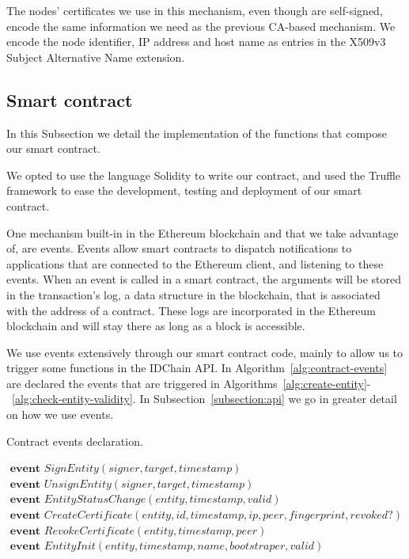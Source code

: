 The nodes' certificates we use in this mechanism, even though are self-signed, encode the same information we need as the previous CA-based mechanism.
We encode the node identifier, IP address and host name as entries in the X509v3 Subject Alternative Name extension.

\subsection{Smart contract}\label{subsection:smart-contract}

In this Subsection we detail the implementation of the functions that compose our smart contract.

We opted to use the language Solidity to write our contract, and used the Truffle framework to ease the development, testing and deployment of our smart contract.

One mechanism built-in in the Ethereum blockchain and that we take advantage of, are events.
Events allow smart contracts to dispatch notifications to applications that are connected to the Ethereum client, and listening to these events.
When an event is called in a smart contract, the arguments will be stored in the transaction's log, a data structure in the blockchain, that is associated with the address of a contract.
These logs are incorporated in the Ethereum blockchain and will stay there as long as a block is accessible.

We use events extensively through our smart contract code, mainly to allow us to trigger some functions in the IDChain API.
In Algorithm~\ref{alg:contract-events} are declared the events that are triggered in Algorithms~\ref{alg:create-entity}-~\ref{alg:check-entity-validity}.
In Subsection~\ref{subsection:api} we go in greater detail on how we use events.

\begin{algorithm}[h!]
  \caption{Contract events declaration.}
  \label{alg:contract-events}
  \begin{algorithmic}
    \State $\textbf{ event } SignEntity(signer, target, timestamp)$
    \State $\textbf{ event } UnsignEntity(signer, target, timestamp)$
    \State $\textbf{ event } EntityStatusChange(entity, timestamp, valid)$
    \State $\textbf{ event } CreateCertificate(entity, id, timestamp, ip, peer, fingerprint, revoked?)$
    \State $\textbf{ event } RevokeCertificate(entity, timestamp, peer)$
    \State $\textbf{ event } EntityInit(entity, timestamp, name, bootstraper, valid)$
  \end{algorithmic}
\end{algorithm}

